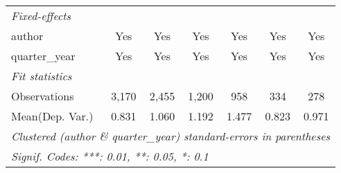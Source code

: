 \begin{tabular}{lcccccc}
   \midrule
   \emph{Fixed-effects}\\
   author                                & Yes           & Yes           & Yes           & Yes           & Yes          & Yes\\  
   quarter\_year                         & Yes           & Yes           & Yes           & Yes           & Yes          & Yes\\  
   \midrule
   \emph{Fit statistics}\\
   Observations                          & 3,170         & 2,455         & 1,200         & 958           & 334          & 278\\  
Mean(Dep. Var.) & 0.831 & 1.060 & 1.192 & 1.477 & 0.823 & 0.971 \\
   \midrule \midrule
   \multicolumn{7}{l}{\emph{Clustered (author \& quarter\_year) standard-errors in parentheses}}\\
   \multicolumn{7}{l}{\emph{Signif. Codes: ***: 0.01, **: 0.05, *: 0.1}}\\
\end{tabular}
\par\endgroup
